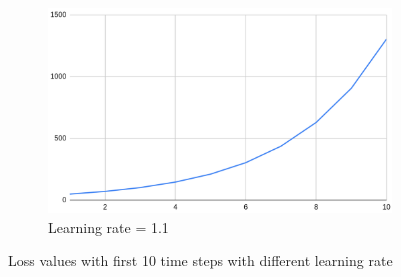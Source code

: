 \documentclass{article}
\begin{document}
\begin{figure}[H]
\begin{subfigure}{0.4\textwidth}
    \includegraphics[width=\linewidth]{lr1.1.png}
    \caption{Learning rate = 1.1}
    \label{fig:lr1.1}
\end{subfigure}
\caption{Loss values with first 10 time steps with different learning rate}
\label{fig:lrs}
\end{figure}
\end{document}
